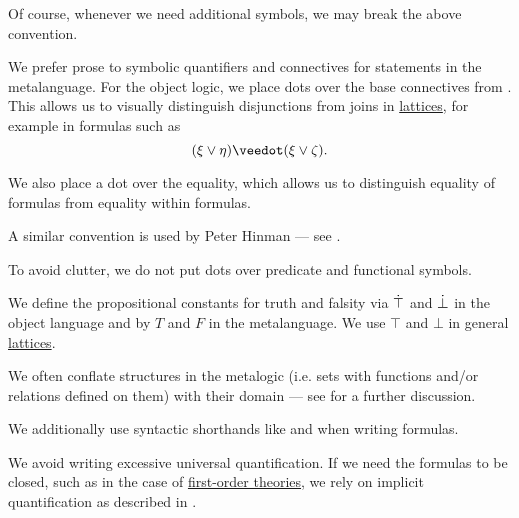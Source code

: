 \begin{remark}
\begin{thmenum}
    Of course, whenever we need additional symbols, we may break the above convention.

     We prefer prose to symbolic quantifiers and connectives for statements in the metalanguage. For the object logic, we place dots over the base connectives from . This allows us to visually distinguish disjunctions from joins in \hyperref[def:lattice]{lattices}, for example in formulas such as
    \begin{equation*}
      (\xi \vee \eta) \synvee (\xi \vee \zeta).
    \end{equation*}

    We also place a dot over the equality, which allows us to distinguish equality of formulas from equality within formulas.

    A similar convention is used by Peter Hinman --- see \cite[rem. 2.1.3]{Hinman2005}.

    To avoid clutter, we do not put dots over predicate and functional symbols.

     We define the propositional constants for truth and falsity via \( \dot\top \) and \( \dot\bot \) in the object language and by \( T \) and \( F \) in the metalanguage. We use \( \top \) and \( \bot \) in general \hyperref[def:lattice]{lattices}.

     We often conflate structures in the metalogic (i.e. sets with functions and/or relations defined on them) with their domain --- see  for a further discussion.

     We additionally use syntactic shorthands like  and  when writing formulas.

     We avoid writing excessive universal quantification. If we need the formulas to be closed, such as in the case of \hyperref[def:first_order_theory]{first-order theories}, we rely on implicit quantification as described in .
  \end{thmenum}
\end{remark}
